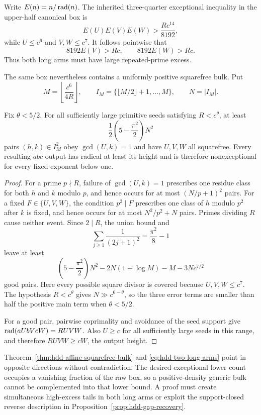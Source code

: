 Write $E(n)=n/\operatorname{rad}(n)$.  The inherited three-quarter exceptional inequality
in the upper-half canonical box is
\[
                         E(U)E(V)E(W)>\frac{Rc^{14}}{8192},
\]
while $U\leq c^6$ and $V,W\leq c^7$.  It follows pointwise that
\begin{equation}\label{eq:hdd-two-long-arms}
                         8192E(V)>Rc,\qquad8192E(W)>Rc.
\end{equation}
Thus both long arms must have large repeated-prime excess.

The same box nevertheless contains a uniformly positive squarefree bulk.
Put
\[
 M=\left\lfloor\frac{c^6}{4R}\right\rfloor,
 \qquad I_M=\{\lfloor M/2\rfloor+1,\ldots,M\},
 \qquad N=|I_M|.
\]

\begin{theorem}
\label{thm:hdd-affine-squarefree-bulk}
Fix $\theta<5/2$.  For all sufficiently large primitive seeds satisfying
$R<c^\theta$, at least
\[
       \frac12\left(5-\frac{\pi^2}{2}\right)N^2
\]
pairs $(h,k)\in I_M^2$ obey $\gcd(U,k)=1$ and have $U,V,W$ all squarefree.
Every resulting $abc$ output has radical at least its height and is therefore
nonexceptional for every fixed exponent below one.
\end{theorem}

\begin{proof}
For a prime $p\nmid R$, failure of $\gcd(U,k)=1$ prescribes one residue class
for both $h$ and $k$ modulo $p$, and hence occurs for at most
$(N/p+1)^2$ pairs.  For a fixed $F\in\{U,V,W\}$, the condition $p^2\mid F$
prescribes one class of $h$ modulo $p^2$ after $k$ is fixed, and hence occurs
for at most $N^2/p^2+N$ pairs.  Primes dividing $R$ cause neither event.
Since $2\mid R$, the union bound and
\[
 \sum_{j\geq1}\frac1{(2j+1)^2}=\frac{\pi^2}{8}-1
\]
leave at least
\[
 \left(5-\frac{\pi^2}{2}\right)N^2
       -2N(1+\log M)-M-3Nc^{7/2}
\]
good pairs.  Here every possible square divisor is covered because
$U,V,W\leq c^7$.  The hypothesis $R<c^\theta$ gives
$N\gg c^{6-\theta}$, so the three error terms are smaller than half the
positive main term when $\theta<5/2$.

For a good pair, pairwise coprimality and avoidance of the seed support give
$\operatorname{rad}(aUbVcW)=RUVW$.  Also $U\geq c$ for all sufficiently large seeds in
this range, and therefore $RUVW\geq cW$, the output height.
\end{proof}

Theorem~\ref{thm:hdd-affine-squarefree-bulk} and
\eqref{eq:hdd-two-long-arms} point in opposite directions without
contradiction.  The desired exceptional lower count occupies a vanishing
fraction of the raw box, so a positive-density generic bulk cannot be
complemented into that lower bound.  A proof must create simultaneous
high-excess tails in both long arms or exploit the support-closed reverse
description in Proposition~\ref{prop:hdd-gap-recovery}.

